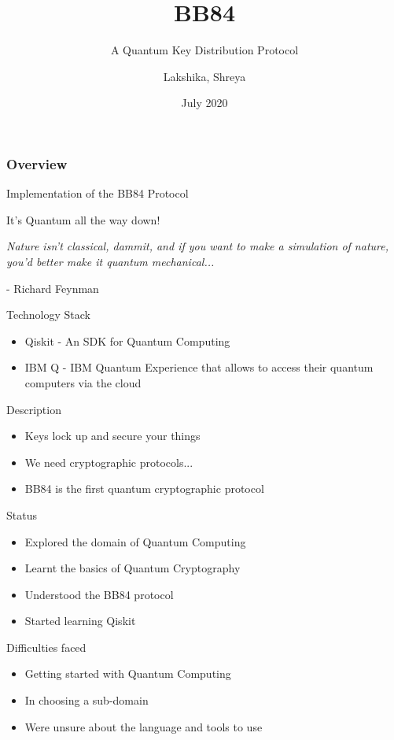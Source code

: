\documentclass[14 pt]{beamer}
\title[BB84]{BB84}
\subtitle{A Quantum Key Distribution Protocol}
\author[Team 37]{Lakshika, Shreya}
\date{July 2020}
\begin{document}
\begin{frame}
	\titlepage
\end{frame}


\begin{frame}
	\frametitle{Overview}
	 Implementation of the BB84 Protocol
\end{frame}


\begin{frame}{It's Quantum all the way down!}
    \begin{center}
        \emph{Nature isn’t classical, dammit, and if you want to make a simulation of nature, you’d better make it quantum mechanical...}
    \end{center}
    \begin{flushright}
        - Richard Feynman
    \end{flushright}
\end{frame}


\begin{frame}{Technology Stack}
	\begin{itemize}
		\item Qiskit - An SDK for Quantum Computing
		\item IBM Q - IBM Quantum Experience that allows to access their quantum computers via the cloud
	\end{itemize}
\end{frame}

\begin{frame}{Description}
    \begin{itemize}[<+->] 
        \item Keys lock up and secure your things
        \item We need cryptographic protocols...
        \item BB84 is the first quantum cryptographic protocol
    \end{itemize}
\end{frame}


\begin{frame}{Status}
	\begin{itemize}
		\item Explored the domain of Quantum Computing
        \item Learnt the basics of Quantum Cryptography
        \item Understood the BB84 protocol
        \item Started learning Qiskit
	\end{itemize}
\end{frame}

\begin{frame}{Difficulties faced}
	\begin{itemize}
		\item Getting started with Quantum Computing
        \item In choosing a sub-domain
        \item Were unsure about the language and tools to use
	\end{itemize}
\end{frame}
		
\end{document}
